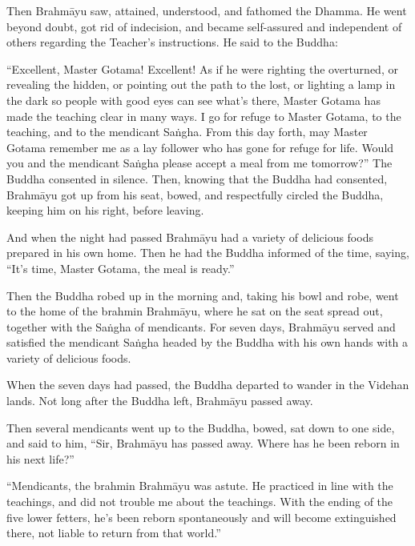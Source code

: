 \documentclass[12pt,openany]{book}%
\begin{document}
Then \textsanskrit{Brahmāyu} saw, attained, understood, and fathomed the Dhamma. He went beyond doubt, got rid of indecision, and became self-assured and independent of others regarding the Teacher’s instructions. He said to the Buddha: 

“Excellent, Master Gotama! Excellent! As if he were righting the overturned, or revealing the hidden, or pointing out the path to the lost, or lighting a lamp in the dark so people with good eyes can see what’s there, Master Gotama has made the teaching clear in many ways. I go for refuge to Master Gotama, to the teaching, and to the mendicant \textsanskrit{Saṅgha}. From this day forth, may Master Gotama remember me as a lay follower who has gone for refuge for life. Would you and the mendicant \textsanskrit{Saṅgha} please accept a meal from me tomorrow?” The Buddha consented in silence. Then, knowing that the Buddha had consented, \textsanskrit{Brahmāyu} got up from his seat, bowed, and respectfully circled the Buddha, keeping him on his right, before leaving. 

And when the night had passed \textsanskrit{Brahmāyu} had a variety of delicious foods prepared in his own home. Then he had the Buddha informed of the time, saying, “It’s time, Master Gotama, the meal is ready.” 

Then the Buddha robed up in the morning and, taking his bowl and robe, went to the home of the brahmin \textsanskrit{Brahmāyu}, where he sat on the seat spread out, together with the \textsanskrit{Saṅgha} of mendicants. For seven days, \textsanskrit{Brahmāyu} served and satisfied the mendicant \textsanskrit{Saṅgha} headed by the Buddha with his own hands with a variety of delicious foods. 

When the seven days had passed, the Buddha departed to wander in the Videhan lands. Not long after the Buddha left, \textsanskrit{Brahmāyu} passed away. 

Then several mendicants went up to the Buddha, bowed, sat down to one side, and said to him, “Sir, \textsanskrit{Brahmāyu} has passed away. Where has he been reborn in his next life?” 

“Mendicants, the brahmin \textsanskrit{Brahmāyu} was astute. He practiced in line with the teachings, and did not trouble me about the teachings. With the ending of the five lower fetters, he’s been reborn spontaneously and will become extinguished there, not liable to return from that world.” 
\end{document}
